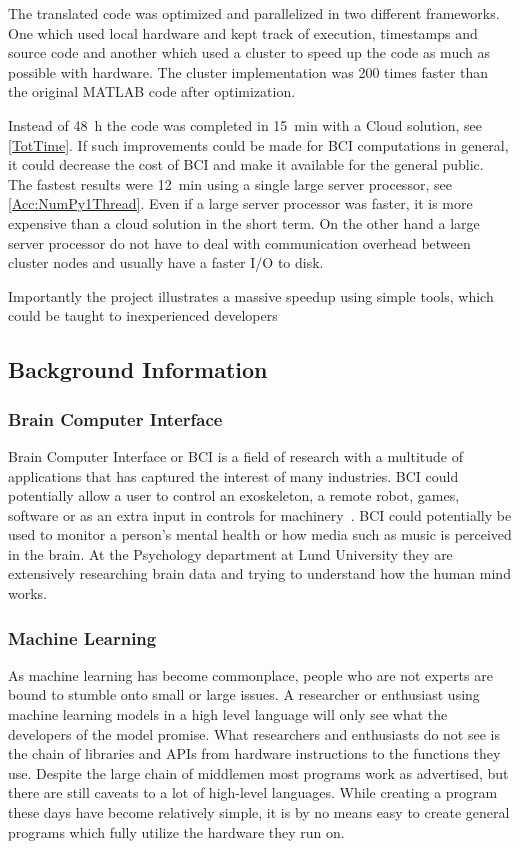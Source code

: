 \documentclass[12pt, a4paper]{article}
\begin{document}
The translated code was optimized and parallelized in two different frameworks.
One which used local hardware and kept track of execution, timestamps and source code and another which used a cluster to speed up the code as much as possible with hardware.
The cluster implementation was 200 times faster than the original MATLAB code after optimization.

Instead of \SI{48}{\hour} the code was completed in \SI{15}{\minute} with a Cloud solution, see \cref{TotTime}.
If such improvements could be made for BCI computations in general, it could decrease the cost of BCI and make it available for the general public.
The fastest results were \SI{12}{\minute} using a single large server processor, see \cref{Acc:NumPy1Thread}.
Even if a large server processor was faster, it is more expensive than a cloud solution in the short term.
On the other hand a large server processor do not have to deal with communication overhead between cluster nodes and usually have a faster I/O to disk.

Importantly the project illustrates a massive speedup using simple tools, which could be taught to inexperienced developers


\subsection{Background Information}

\subsubsection{Brain Computer Interface}

Brain Computer Interface or BCI is a field of research with a multitude of applications that has captured the interest of many industries.
BCI could potentially allow a user to control an exoskeleton, a remote robot, games, software or as an extra input in controls for machinery~\cite{10.3389/fnins.2010.00198}.
BCI could potentially be used to monitor a person's mental health or how media such as music is perceived in the brain.
At the Psychology department at Lund University they are extensively researching brain data and trying to understand how the human mind works.

\subsubsection{Machine Learning}

As machine learning has become commonplace, people who are not experts are bound to stumble onto small or large issues.
A researcher or enthusiast using machine learning models in a high level language will only see what the developers of the model promise.
What researchers and enthusiasts do not see is the chain of libraries and APIs from hardware instructions to the functions they use.
Despite the large chain of middlemen most programs work as advertised, but there are still caveats to a lot of high-level languages. 
While creating a program these days have become relatively simple, it is by no means easy to create general programs which fully utilize the hardware they run on.
\end{document}
